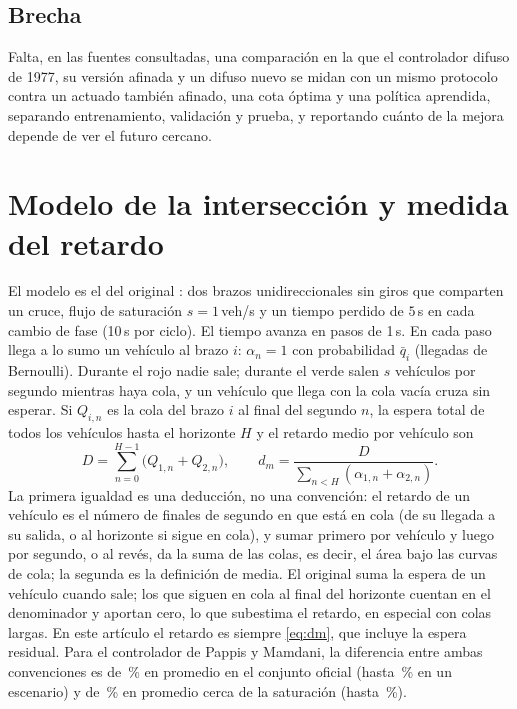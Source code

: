 \documentclass[journal]{IEEEtran}
\newcommand{\qbar}{\bar{q}}              %
\begin{document}
\subsection{Brecha}
Falta, en las fuentes consultadas, una comparación en la que el controlador difuso de 1977, su versión afinada y un difuso nuevo se midan con un mismo protocolo contra un actuado también afinado, una cota óptima y una política aprendida, separando entrenamiento, validación y prueba, y reportando cuánto de la mejora depende de ver el futuro cercano.

\section{Modelo de la intersección y medida del retardo}
\label{sec:modelo}

El modelo es el del original \cite{Pappis1977}: dos brazos unidireccionales sin giros que comparten un cruce, flujo de saturación $s=1$\,veh/s y un tiempo perdido de $5$\,s en cada cambio de fase (10\,s por ciclo). El tiempo avanza en pasos de 1\,s. En cada paso llega a lo sumo un vehículo al brazo $i$: $\alpha_n=1$ con probabilidad $\qbar_i$ (llegadas de Bernoulli). Durante el rojo nadie sale; durante el verde salen $s$ vehículos por segundo mientras haya cola, y un vehículo que llega con la cola vacía cruza sin esperar. Si $Q_{i,n}$ es la cola del brazo $i$ al final del segundo $n$, la espera total de todos los vehículos hasta el horizonte $H$ y el retardo medio por vehículo son
\begin{equation}
D=\sum_{n=0}^{H-1}\bigl(Q_{1,n}+Q_{2,n}\bigr),\qquad d_m=\frac{D}{\sum_{n<H}(\alpha_{1,n}+\alpha_{2,n})}.
\label{eq:dm}
\end{equation}
La primera igualdad es una deducción, no una convención: el retardo de un vehículo es el número de finales de segundo en que está en cola (de su llegada a su salida, o al horizonte si sigue en cola), y sumar primero por vehículo y luego por segundo, o al revés, da la suma de las colas, es decir, el área bajo las curvas de cola; la segunda es la definición de media. El original suma la espera de un vehículo cuando sale; los que siguen en cola al final del horizonte cuentan en el denominador y aportan cero, lo que subestima el retardo, en especial con colas largas. En este artículo el retardo es siempre \eqref{eq:dm}, que incluye la espera residual. Para el controlador de Pappis y Mamdani, la diferencia entre ambas convenciones es de \ResDifOf\,\% en promedio en el conjunto oficial (hasta \ResDifOfMax\,\% en un escenario) y de \ResDifSa\,\% en promedio cerca de la saturación (hasta \ResDifSaMax\,\%).
\end{document}
